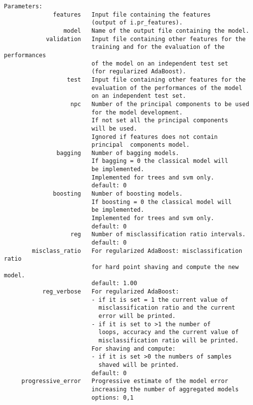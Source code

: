 \begin{verbatim}
Parameters:
              features   Input file containing the features 
                         (output of i.pr_features).
                 model   Name of the output file containing the model.
            validation   Input file containing other features for the 
                         training and for the evaluation of the performances 
                         of the model on an independent test set 
                         (for regularized AdaBoost).
                  test   Input file containing other features for the 
                         evaluation of the performances of the model 
                         on an independent test set.
                   npc   Number of the principal components to be used 
                         for the model development.
                         If not set all the principal components 
                         will be used.
                         Ignored if features does not contain 
                         principal  components model.
               bagging   Number of bagging models.
                         If bagging = 0 the classical model will
                         be implemented.
                         Implemented for trees and svm only.
                         default: 0
              boosting   Number of boosting models.
                         If boosting = 0 the classical model will 
                         be implemented.
                         Implemented for trees and svm only.
                         default: 0
                   reg   Number of misclassification ratio intervals.
                         default: 0
        misclass_ratio   For regularized AdaBoost: misclassification ratio 
                         for hard point shaving and compute the new model.
                         default: 1.00
           reg_verbose   For regularized AdaBoost:
                         - if it is set = 1 the current value of 
                           misclassification ratio and the current 
                           error will be printed.
                         - if it is set to >1 the number of
                           loops, accuracy and the current value of 
                           misclassification ratio will be printed.
                         For shaving and compute:
                         - if it is set >0 the numbers of samples 
                           shaved will be printed.
                         default: 0
     progressive_error   Progressive estimate of the model error
                         increasing the number of aggregated models
                         options: 0,1

\end{verbatim}
